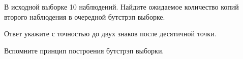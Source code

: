 
\begin{question}
В исходной выборке 10 наблюдений.
Найдите ожидаемое количество копий второго наблюдения в очередной бутстрэп выборке.

Ответ укажите с точностью до двух знаков после десятичной точки.
\end{question}

\begin{solution}
Вспомните принцип построения бутстрэп выборки.
\end{solution}

